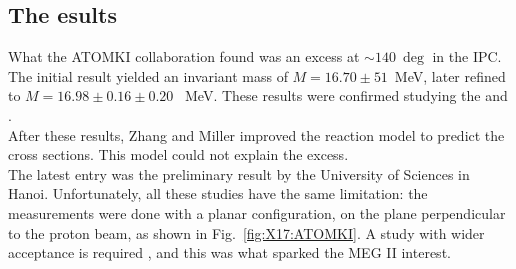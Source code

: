 \begin{refsection}
        \begin{figure}
            \centering
            \caption{}
            \label{fig:X17:states}
        \end{figure}

    \subsection{The esults}
        What the ATOMKI collaboration found was an excess at $\sim\SI{140}{\deg}$ in the IPC. 
        The initial result yielded an invariant mass of $M = 16.70\pm51$~MeV, later refined to $M=16.98\pm0.16\pm0.20$~ MeV.
        These results were confirmed studying the  and .\\
        After these results, Zhang and Miller \cite{} improved the reaction model to predict the cross sections. This model could not explain the excess.\\
        The latest entry was the preliminary result by the  University of Sciences in Hanoi.
        Unfortunately, all these studies have the same limitation: the measurements were done with a planar configuration,  on the plane perpendicular to the proton beam, as shown in Fig.~\ref{fig:X17:ATOMKI}.
        A study with wider acceptance is required \cite{}, and this was what sparked the MEG II interest.
        

\end{refsection}

